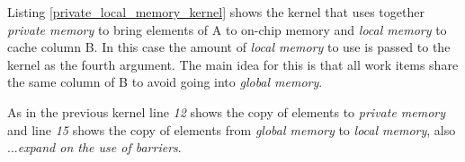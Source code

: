 
\par{Listing \ref{private_local_memory_kernel} shows the kernel that uses together \emph{private memory} to bring elements of A to 
    on-chip memory and \emph{local memory} to cache column B. In 
    this case the amount of \emph{local memory} to use is passed to the kernel as the fourth argument. The main idea for this is
    that all work items share the same column of B to avoid going into \emph{global memory}.}

\par{As in the previous kernel line \emph{12} shows the copy of elements to \emph{private memory} and line \emph{15} shows the 
    copy of elements from \emph{global memory} to \emph{local memory}, also ...\emph{expand on the use of barriers}.}



